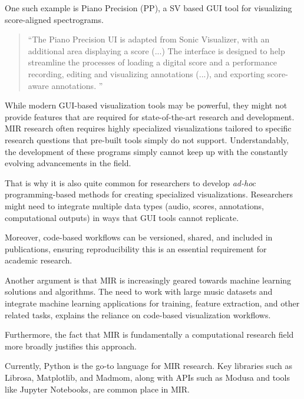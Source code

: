 One such example is Piano Precision (\ac{PP}), a \ac{SV} based GUI tool for visualizing score-aligned spectrograms.

\begin{quotation}
``The Piano Precision UI is adapted from Sonic Visualizer, with an additional area displaying a score (...) The interface is designed to help streamline the processes of loading a digital score and a performance recording, editing and visualizing annotations (...), and exporting score-aware annotations. ''\cite{jiangPIANOPRECISIONADVANCING2025}
\end{quotation}


While modern \ac{GUI}-based visualization tools may be powerful, they might not provide features that are required for state-of-the-art research and development. \ac{MIR} research often requires highly specialized visualizations tailored to specific research questions that pre-built tools simply do not support. Understandably, the development of these programs simply cannot keep up with the constantly evolving advancements in the field.

That is why it is also quite common for researchers to develop \textit{ad-hoc} programming-based methods for creating specialized visualizations. Researchers might need to integrate multiple data types (audio, scores, annotations, computational outputs) in ways that \ac{GUI} tools cannot replicate.

Moreover, code-based workflows can be versioned, shared, and included in publications, ensuring reproducibility this is an essential requirement for academic research.

Another argument is that \ac{MIR} is increasingly geared towards machine learning solutions and algorithms. The need to work with large music datasets and integrate machine learning applications for training, feature extraction, and other related tasks, explains the reliance on code-based visualization workflows.

Furthermore, the fact that \ac{MIR} is fundamentally a computational research field more broadly justifies this approach.

Currently, Python is the go-to language for \ac{MIR} research. Key libraries such as Librosa, Matplotlib, and Madmom, along with APIs such as Modusa and tools like Jupyter Notebooks, are common place in \ac{MIR}.

